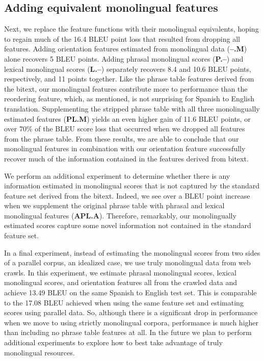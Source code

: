 \documentclass[11pt]{article}
\begin{document}
\subsection{Adding equivalent monolingual features} \label{sect:exp:replacement}

Next, we replace the feature functions with their monolingual equivalents, hoping to regain much of the 16.4 BLEU point loss that resulted from dropping all features.  Adding orientation features estimated from monolingual data ({\bf --.M}) alone recovers 5 BLEU points. Adding phrasal monolingual scores ({\bf P.--}) and lexical monolingual scores ({\bf L.--}) separately recovers 8.4 and 10.6 BLEU points, respectively, and 11 points together. Like the phrase table features derived from the bitext, our monolingual features contribute more to performance than the reordering feature, which, as mentioned, is not surprising for Spanish to English translation. Supplementing the stripped phrase table with all three monolingually estimated features ({\bf PL.M}) yields an even higher gain of 11.6 BLEU points, or over 70\% of the BLEU score loss that occurred when we dropped all features from the phrase table. From these results, we are able to conclude that our monolingual features in combination with our orientation feature successfully recover much of the information contained in the features derived from bitext. 

We perform an additional experiment to determine whether there is any information estimated in monolingual scores that is not captured by the standard feature set derived from the bitext. Indeed, we see over a BLEU point increase when we supplement the original phrase table with phrasal and lexical monolingual features ({\bf APL.A}). Therefore, remarkably, our monolingually estimated scores capture some novel information not contained in the standard feature set.

In a final experiment, instead of estimating the monolingual scores from two sides of a parallel corpus, an idealized case, we use truly monolingual data from web crawls. In this experiment, we estimate phrasal monolingual scores, lexical monolingual scores, and orientation features all from the crawled data and achieve 13.49 BLEU on the same Spanish to English test set. This is comparable to the 17.08 BLEU achieved when using the same feature set and estimating scores using parallel data. So, although there is a significant drop in performance when we move to using strictly monolingual corpora, performance is much higher than including no phrase table features at all. In the future we plan to perform additional experiments to explore how to best take advantage of truly monolingual resources.
\end{document}
